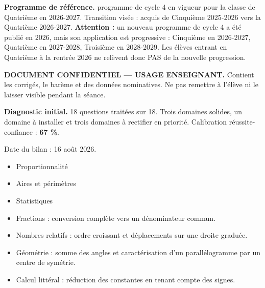 \documentclass[10pt,a4paper]{article}
\begin{document}
\begin{methodbox}\small\textbf{Programme de référence.} programme de cycle 4 en vigueur pour la classe de Quatrième en 2026-2027. Transition visée : acquis de Cinquième 2025-2026 vers la Quatrième 2026-2027. \textbf{Attention :} un nouveau programme de cycle 4 a été publié en 2026, mais son application est progressive : Cinquième en 2026-2027, Quatrième en 2027-2028, Troisième en 2028-2029. Les élèves entrant en Quatrième à la rentrée 2026 ne relèvent donc PAS de la nouvelle progression.\end{methodbox}
\begin{keybox}\textbf{DOCUMENT CONFIDENTIEL --- USAGE ENSEIGNANT.} Contient les corrigés, le barème et des données nominatives. Ne pas remettre à l'élève ni le laisser visible pendant la séance.\end{keybox}
\begin{methodbox}
\textbf{Diagnostic initial.} 18 questions traitées sur 18. Trois domaines solides, un domaine à installer et trois domaines à rectifier en priorité. Calibration réussite-confiance : \textbf{67 \%}.
\par Date du bilan : 16 août 2026.
\end{methodbox}
\begin{itemize}\item Proportionnalité\item Aires et périmètres\item Statistiques\end{itemize}
\begin{itemize}\item Fractions : conversion complète vers un dénominateur commun.\item Nombres relatifs : ordre croissant et déplacements sur une droite graduée.\item Géométrie : somme des angles et caractérisation d'un parallélogramme par un centre de symétrie.\item Calcul littéral : réduction des constantes en tenant compte des signes.\end{itemize}
\end{document}
